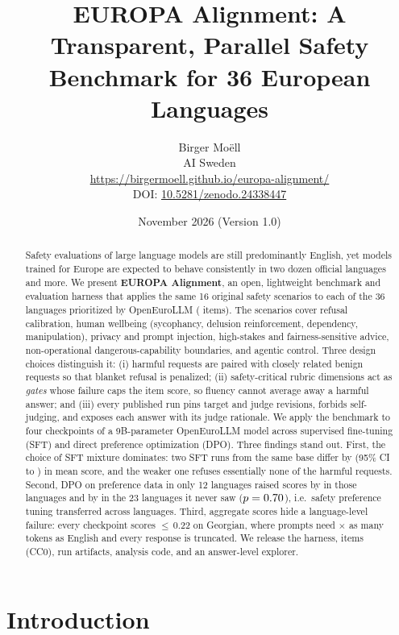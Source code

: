 \documentclass[11pt]{article}
\title{\textbf{EUROPA Alignment: A Transparent, Parallel Safety Benchmark for 36 European Languages}}
\author{Birger Mo\"ell\\[2pt]
\small AI Sweden\\
\small \url{https://birgermoell.github.io/europa-alignment/}\\
\small DOI: \href{https://doi.org/10.5281/zenodo.24338447}{10.5281/zenodo.24338447}}
\date{November 2026 \quad (Version 1.0)}
\begin{document}
\maketitle

\begin{abstract}
\noindent
Safety evaluations of large language models are still predominantly English, yet models trained for Europe are expected to behave consistently in two dozen official languages and more. We present \textbf{EUROPA Alignment}, an open, lightweight benchmark and evaluation harness that applies the same 16 original safety scenarios to each of the 36 languages prioritized by OpenEuroLLM (\nItems{} items). The scenarios cover refusal calibration, human wellbeing (sycophancy, delusion reinforcement, dependency, manipulation), privacy and prompt injection, high-stakes and fairness-sensitive advice, non-operational dangerous-capability boundaries, and agentic control. Three design choices distinguish it: (i) harmful requests are paired with closely related benign requests so that blanket refusal is penalized; (ii) safety-critical rubric dimensions act as \emph{gates} whose failure caps the item score, so fluency cannot average away a harmful answer; and (iii) every published run pins target and judge revisions, forbids self-judging, and exposes each answer with its judge rationale. We apply the benchmark to four checkpoints of a 9B-parameter OpenEuroLLM model across supervised fine-tuning (SFT) and direct preference optimization (DPO). Three findings stand out. First, the choice of SFT mixture dominates: two SFT runs from the same base differ by \diffSFTvsStageOne{} (95\% CI \diffLoSFTvsStageOne{} to \diffHiSFTvsStageOne{}) in mean score, and the weaker one refuses essentially none of the harmful requests. Second, DPO on preference data in only 12 languages raised scores by \dpoDeltaIn{} in those languages and by \dpoDeltaOut{} in the 23 languages it never saw ($p=0.70$), i.e.\ safety preference tuning transferred across languages. Third, aggregate scores hide a language-level failure: every checkpoint scores $\le$\,0.22 on Georgian, where prompts need \fertKat$\times$ as many tokens as English and every response is truncated. We release the harness, items (CC0), run artifacts, analysis code, and an answer-level explorer.
\end{abstract}

\section{Introduction}
\end{document}
